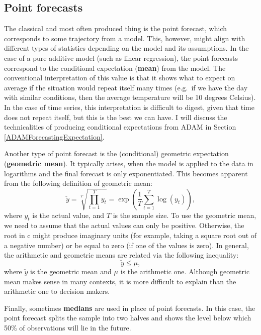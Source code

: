 \documentclass[
]{book}
\theoremstyle{definition}
\theoremstyle{definition}
\theoremstyle{definition}
\theoremstyle{definition}
\theoremstyle{remark}
\begin{document}
\hypertarget{typesOfForecastsPoint}{%
\subsection{Point forecasts}\label{typesOfForecastsPoint}}

The classical and most often produced thing is the point forecast, which corresponds to some trajectory from a model. This, however, might align with different types of statistics depending on the model and its assumptions. In the case of a pure additive model (such as linear regression), the point forecasts correspond to the conditional expectation (\textbf{mean}) from the model. The conventional interpretation of this value is that it shows what to expect on average if the situation would repeat itself many times (e.g.~if we have the day with similar conditions, then the average temperature will be 10 degrees Celsius). In the case of time series, this interpretation is difficult to digest, given that time does not repeat itself, but this is the best we can have. I will discuss the technicalities of producing conditional expectations from ADAM in Section \ref{ADAMForecastingExpectation}.

Another type of point forecast is the (conditional) geometric expectation (\textbf{geometric mean}). It typically arises, when the model is applied to the data in logarithms and the final forecast is only exponentiated. This becomes apparent from the following definition of geometric mean:
\begin{equation}
    \check{y} = \sqrt[T]{\prod_{t=1}^T y_t} = \exp \left(\frac{1}{T} \sum_{t=1}^T \log(y_t) \right) ,
    \label{eq:GeoMean}
\end{equation}
where \(y_t\) is the actual value, and \(T\) is the sample size. To use the geometric mean, we need to assume that the actual values can only be positive. Otherwise, the root in c might produce imaginary units (for example, taking a square root out of a negative number) or be equal to zero (if one of the values is zero). In general, the arithmetic and geometric means are related via the following inequality:
\begin{equation}
    \check{y} \leq \mu ,
    \label{eq:GeoAndArithMeans}
\end{equation}
where \(\check{y}\) is the geometric mean and \(\mu\) is the arithmetic one. Although geometric mean makes sense in many contexts, it is more difficult to explain than the arithmetic one to decision makers.

Finally, sometimes \textbf{medians} are used in place of point forecasts. In this case, the point forecast splits the sample into two halves and shows the level below which 50\% of observations will lie in the future.
\end{document}
